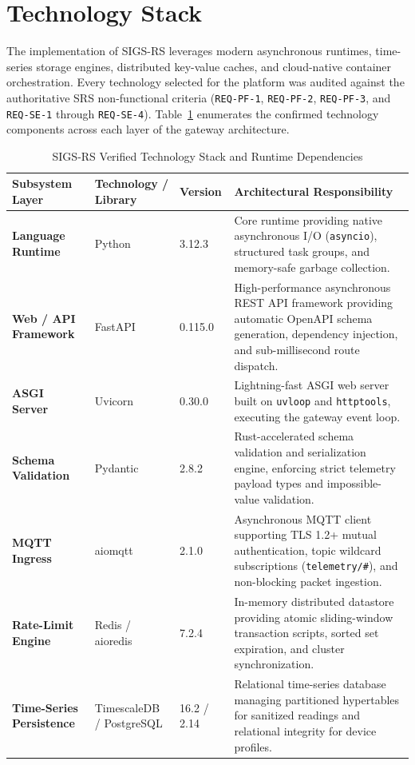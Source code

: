 \section{Technology Stack}

The implementation of SIGS-RS leverages modern asynchronous runtimes, time-series storage engines, distributed key-value caches, and cloud-native container orchestration. Every technology selected for the platform was audited against the authoritative SRS non-functional criteria (\texttt{REQ-PF-1}, \texttt{REQ-PF-2}, \texttt{REQ-PF-3}, and \texttt{REQ-SE-1} through \texttt{REQ-SE-4}). Table~\ref{tab:tech_stack} enumerates the confirmed technology components across each layer of the gateway architecture.

\begin{table}[H]
\centering
\caption{SIGS-RS Verified Technology Stack and Runtime Dependencies}
\label{tab:tech_stack}
\small
\begin{tabularx}{\linewidth}{@{}p{2.8cm} p{2.8cm} p{1.8cm} X@{}}
\toprule
\textbf{Subsystem Layer} & \textbf{Technology / Library} & \textbf{Version} & \textbf{Architectural Responsibility} \\
\midrule
\textbf{Language Runtime} & Python & 3.12.3 & Core runtime providing native asynchronous I/O (\texttt{asyncio}), structured task groups, and memory-safe garbage collection. \\
\textbf{Web / API Framework} & FastAPI & 0.115.0 & High-performance asynchronous REST API framework providing automatic OpenAPI schema generation, dependency injection, and sub-millisecond route dispatch. \\
\textbf{ASGI Server} & Uvicorn & 0.30.0 & Lightning-fast ASGI web server built on \texttt{uvloop} and \texttt{httptools}, executing the gateway event loop. \\
\textbf{Schema Validation} & Pydantic & 2.8.2 & Rust-accelerated schema validation and serialization engine, enforcing strict telemetry payload types and impossible-value validation. \\
\textbf{MQTT Ingress} & aiomqtt & 2.1.0 & Asynchronous MQTT client supporting TLS 1.2+ mutual authentication, topic wildcard subscriptions (\texttt{telemetry/\#}), and non-blocking packet ingestion. \\
\textbf{Rate-Limit Engine} & Redis / aioredis & 7.2.4 & In-memory distributed datastore providing atomic sliding-window transaction scripts, sorted set expiration, and cluster synchronization. \\
\textbf{Time-Series Persistence} & TimescaleDB / PostgreSQL & 16.2 / 2.14 & Relational time-series database managing partitioned hypertables for sanitized readings and relational integrity for device profiles. \\

\end{tabularx}
\end{table}
